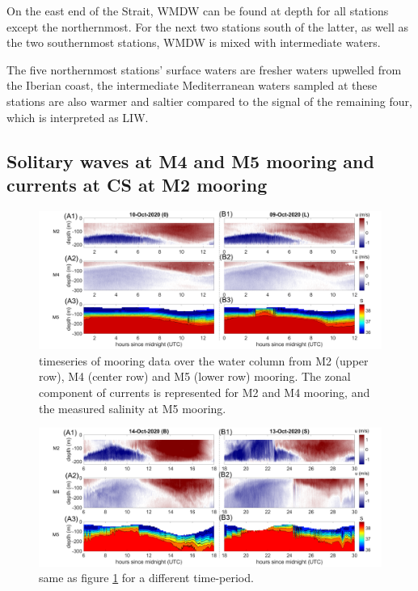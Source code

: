 On the east end of the Strait, WMDW can be found at depth for all stations except the northernmost. For the next two stations south of the latter, as well as the two southernmost stations, WMDW is mixed with intermediate waters. 

The five northernmost stations' surface waters are fresher waters upwelled from the Iberian coast, the intermediate Mediterranean waters sampled at these stations are also warmer and saltier compared to the signal of the remaining four, which is interpreted as LIW.


\subsection{Solitary waves at M4 and M5 mooring and currents at CS at M2 mooring}
\label{section_obs_moor}

\begin{figure}[!h]
 \includegraphics[width=\textwidth]{./GBR3D/US_moorings1.png}
 \caption {timeseries of mooring data over the water column from M2 (upper row), M4 (center row) and M5 (lower row) mooring. The zonal component of currents is represented for M2 and M4 mooring, and the measured salinity at M5 mooring.}
 \label{fig_moor_US1}
\end{figure}

\begin{figure}[!h]
 \includegraphics[width=\textwidth]{./GBR3D/US_moorings2.png}
 \caption {same as figure \ref{fig_moor_US1} for a different time-period.}
 \label{fig_moor_US2}
\end{figure}

